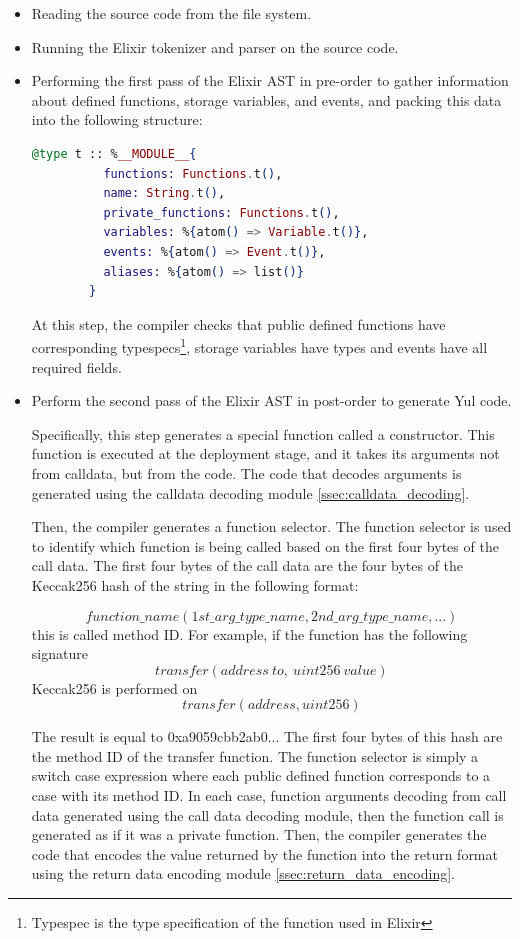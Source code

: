 \begin{itemize}
    \item Reading the source code from the file system.
    \item Running the Elixir tokenizer and parser on the source code.
    \item Performing the first pass of the Elixir AST in pre-order to gather information about defined functions, storage variables, and events, and packing this data into the following structure:
    
    \begin{lstlisting}[caption={Contract structure}, language=elixir, label={lst:contract_structure}]
      @type t :: %__MODULE__{
          functions: Functions.t(),
          name: String.t(),
          private_functions: Functions.t(),
          variables: %{atom() => Variable.t()},
          events: %{atom() => Event.t()},
          aliases: %{atom() => list()}
        }
    \end{lstlisting}
    
    At this step, the compiler checks that public defined functions have corresponding typespecs\footnote{Typespec is the type specification of the function used in Elixir}, storage variables have types and events have all required fields.

    \item Perform the second pass of the Elixir AST in post-order to generate Yul code.
    
    Specifically, this step generates a special function called a constructor. This function is executed at the deployment stage, and it takes its arguments not from calldata, but from the code. The code that decodes arguments is generated using the calldata decoding module \ref{ssec:calldata_decoding}.

    Then, the compiler generates a function selector. The function selector is used to identify which function is being called based on the first four bytes of the call data. The first four bytes of the call data are the four bytes of the Keccak256 hash of the string in the following format:

    $$function\_name(1st\_arg\_type\_name,2nd\_arg\_type\_name,...)$$
    this is called method ID. For example, if the function has the following signature 
    $$transfer(address\ to,\ uint256\ value)$$
    Keccak256 is performed on 
    $$transfer(address,uint256)$$

    The result is equal to 0xa9059cbb2ab0... The first four bytes of this hash are the method ID of the transfer function. The function selector is simply a switch case expression where each public defined function corresponds to a case with its method ID. In each case, function arguments decoding from call data generated using the call data decoding module, then the function call is generated as if it was a private function. Then, the compiler generates the code that encodes the value returned by the function into the return format using the return data encoding module \ref{ssec:return_data_encoding}.


\end{itemize}
